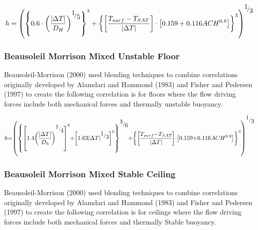 \begin{equation}
h = {\left( {{{\left\{ {0.6 \cdot {{\left( {\frac{{\left| {\Delta T} \right|}}{{{D_H}}}} \right)}^{{\raise0.7ex\hbox{1} \!\mathord{\left/ {\vphantom {1 5}}\right.}\!\lower0.7ex\hbox{5}}}}} \right\}}^3} + {{\left\{ {\left[ {\frac{{{T_{surf}} - {T_{SAT}}}}{{\left| {\Delta T} \right|}}} \right]\cdot\left[ {0.159 + 0.116AC{H^{0.8}}} \right]} \right\}}^3}} \right)^{{\raise0.7ex\hbox{1} \!\mathord{\left/ {\vphantom {1 3}}\right.}\!\lower0.7ex\hbox{3}}}}
\end{equation}

\subsubsection{Beausoleil Morrison Mixed Unstable Floor}\label{beausoleil-morrison-mixed-unstable-floor}

Beausoleil-Morrison (2000) used blending techniques to combine correlations originally developed by Alamdari and Hammond (1983) and Fisher and Pedersen (1997) to create the following correlation is for floors where the flow driving forces include both mechanical forces and thermally unstable buoyancy.

\begin{equation}
\medmuskip=0mu
\thinmuskip=0mu
\thickmuskip=0mu
\nulldelimiterspace=0pt
\scriptspace=0pt
h = {\left( {{{\left\{ {{{\left[ {1.4{{\left( {\frac{{\left| {\Delta T} \right|}}{{{D_h}}}} \right)}^{^{{\raise0.7ex\hbox{1} \!\mathord{\left/ {\vphantom {1 4}}\right.}\!\lower0.7ex\hbox{4}}}}}} \right]}^6} + {{\left[ {1.63{{\left| {\Delta T} \right|}^{{\raise0.7ex\hbox{1} \!\mathord{\left/ {\vphantom {1 3}}\right.}\!\lower0.7ex\hbox{3}}}}} \right]}^6}} \right\}}^{{\raise0.7ex\hbox{3} \!\mathord{\left/ {\vphantom {3 6}}\right.}\!\lower0.7ex\hbox{6}}}} + {{\left\{ {\left[ {\frac{{{T_{surf}} - {T_{SAT}}}}{{\left| {\Delta T} \right|}}} \right]\cdot\left[ {0.159 + 0.116AC{H^{0.8}}} \right]} \right\}}^3}} \right)^{{\raise0.7ex\hbox{1} \!\mathord{\left/ {\vphantom {1 3}}\right.}\!\lower0.7ex\hbox{3}}}}
\end{equation}

\subsubsection{Beausoleil Morrison Mixed Stable Ceiling}\label{beausoleil-morrison-mixed-stable-ceiling}

Beausoleil-Morrison (2000) used blending techniques to combine correlations originally developed by Alamdari and Hammond (1983) and Fisher and Pedersen (1997) to create the following correlation is for ceilings where the flow driving forces include both mechanical forces and thermally Stable buoyancy.

